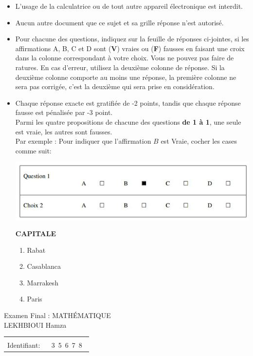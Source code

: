 \documentclass{book}%
\begin{document}
\begin{itemize}%
\item%
L'usage de la calculatrice ou de tout autre appareil électronique est interdit.%
\item%
Aucun autre document que ce sujet et sa grille réponse n'est autorisé.%
\item%
Pour chacune des questions, indiquez sur la feuille de réponses ci-jointes, si les affirmations A, B, C et D sont (\textbf{V}) vraies ou (\textbf{F}) fausses en faisant une croix dans la colonne correspondant à votre choix. Vous ne pouvez pas faire de ratures. En cas d'erreur, utilisez la deuxième colonne de réponse. Si la deuxième colonne comporte au moins une réponse, la première colonne ne sera pas corrigée, c'est la deuxième qui sera prise en considération.%
\item%
Chaque réponse exacte est gratifiée de -2 points, tandis que chaque réponse fausse est pénalisée par -3 point. \\ 	Parmi les quatre propositions de chacune des questions \textbf{de 1 à 1}, une seule est vraie, les autres sont fausses. \\ 	Par exemple : Pour indiquer que l'affirmation $B$ est Vraie, cocher les cases comme suit:  \\ \begin{center}	\includegraphics[scale=0.8]{reponses.png} \end{center}%
\thispagestyle{empty}%
\begin{exercise}%
\textbf{CAPITALE }%
\begin{enumerate}[label=\textbf{\Alph*. }]%
\item%
Rabat%
\item%
Casablanca%
\item%
Marrakesh%
\item%
Paris%
\end{enumerate}%
\end{exercise}%
\end{itemize}%
\newpage%
\thispagestyle{empty}%
Examen Final : MATHÉMATIQUE $\qquad \qquad \qquad \qquad \qquad \qquad \qquad \qquad$ LEKHBIOUI Hamza%
\begin{flushright}%
\begin{tabular}{|l|}%
\hline%
 \\%
\thispagestyle{empty}%
Identifiant: $\quad$ {\Large 3~5~6~7~8~}%
 \\%
\hline%
\end{tabular}%
\end{flushright}%
\end{document}
